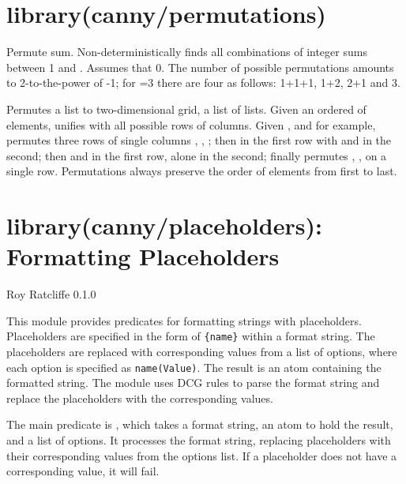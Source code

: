 \chapter{library(canny/permutations)}\label{sec:permutations}

\begin{description}
Permute sum. Non-deterministically finds all combinations of integer
sums between 1 and . Assumes that 0\Sel{}. The number of possible
permutations amounts to 2-to-the-power of -1; for =3 there are
four as follows: 1+1+1, 1+2, 2+1 and 3.

Permutes a list to two-dimensional grid, a list of lists. Given an
ordered  of elements, unifies  with all possible rows of
columns. Given ,  and  for example, permutes three rows of
single columns , , ; then  in the first row with  and
 in the second; then  and  in the first row,  alone in
the second; finally permutes , ,  on a single row.
Permutations always preserve the order of elements from first to
last.
\end{description}

\chapter{library(canny/placeholders): Formatting Placeholders}\label{sec:placeholders}

\begin{tags}
Roy Ratcliffe
0.1.0
\end{tags}

This module provides predicates for formatting strings with placeholders.
Placeholders are specified in the form of \verb${name}$ within a format string.
The placeholders are replaced with corresponding values from a list of
options, where each option is specified as \verb$name(Value)$.
The result is an atom containing the formatted string.
The module uses DCG rules to parse the format string and replace the
placeholders with the corresponding values.

The main predicate is , which takes a format
string, an atom to hold the result, and a list of options. It processes
the format string, replacing placeholders with their corresponding values
from the options list. If a placeholder does not have a corresponding value,
it will fail.

